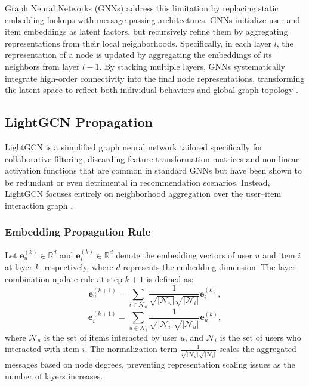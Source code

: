 Graph Neural Networks (GNNs) address this limitation by replacing static embedding lookups with message-passing architectures. GNNs initialize user and item embeddings as latent factors, but recursively refine them by aggregating representations from their local neighborhoods. Specifically, in each layer \(l\), the representation of a node is updated by aggregating the embeddings of its neighbors from layer \(l-1\). By stacking multiple layers, GNNs systematically integrate high-order connectivity into the final node representations, transforming the latent space to reflect both individual behaviors and global graph topology \parencite{11359174}.

\subsection{LightGCN Propagation}

LightGCN is a simplified graph neural network tailored specifically for collaborative filtering, discarding feature transformation matrices and non-linear activation functions that are common in standard GNNs but have been shown to be redundant or even detrimental in recommendation scenarios. Instead, LightGCN focuses entirely on neighborhood aggregation over the user--item interaction graph \parencite{he2020lightgcnsimplifyingpoweringgraph}.

\subsubsection{Embedding Propagation Rule}

Let \(\mathbf{e}_u^{(k)} \in \mathbb{R}^d\) and \(\mathbf{e}_i^{(k)} \in \mathbb{R}^d\) denote the embedding vectors of user \(u\) and item \(i\) at layer \(k\), respectively, where \(d\) represents the embedding dimension. The layer-combination update rule at step \(k+1\) is defined as:
\begin{equation}
    \mathbf{e}_u^{(k+1)} = \sum_{i \in \mathcal{N}_u} \frac{1}{\sqrt{|\mathcal{N}_u|} \sqrt{|\mathcal{N}_i|}} \mathbf{e}_i^{(k)},
    \label{eq:prop_user}
\end{equation}
\begin{equation}
    \mathbf{e}_i^{(k+1)} = \sum_{u \in \mathcal{N}_i} \frac{1}{\sqrt{|\mathcal{N}_i|} \sqrt{|\mathcal{N}_u|}} \mathbf{e}_u^{(k)},
    \label{eq:prop_item}
\end{equation}
where \(\mathcal{N}_u\) is the set of items interacted by user \(u\), and \(\mathcal{N}_i\) is the set of users who interacted with item \(i\). The normalization term \(\frac{1}{\sqrt{|\mathcal{N}_u|} \sqrt{|\mathcal{N}_i|}}\) scales the aggregated messages based on node degrees, preventing representation scaling issues as the number of layers increases.

